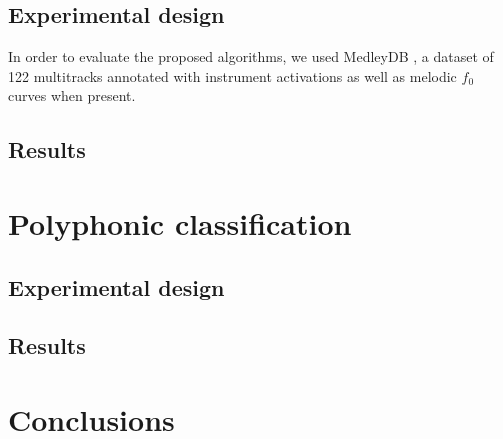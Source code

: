 \documentclass{article}
\begin{document}
\subsection{Experimental design}
In order to evaluate the proposed algorithms, we used MedleyDB \cite{Bittner2014}, a dataset of 122 multitracks annotated with instrument activations as well as melodic $f_0$ curves when present.


\subsection{Results}


\section{Polyphonic classification}\label{sec:polyphonic}
\subsection{Experimental design}

\subsection{Results}


\section{Conclusions}


\end{document}
